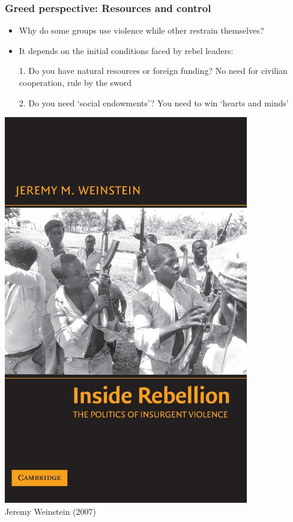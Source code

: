 \documentclass[aspectratio=43]{beamer}
\begin{document}
\begin{frame}
\frametitle{Greed perspective: Resources and control}
\centering

\begin{minipage}{0.6\textwidth}\centering
  \begin{itemize}[<+->]
    \item Why do some groups use violence while other restrain themselves?
    \item It depends on the initial conditions faced by rebel leaders:
    \item[1.] Do you have natural resources or foreign funding? No need for civilian cooperation, rule by the sword
    \item[2.] Do you need `social endowments'? You need to win `hearts and minds'
  \end{itemize}
\end{minipage}\hfill
\begin{minipage}{0.39\textwidth}\centering
\includegraphics[width = 0.8\textwidth]{img/weinstein2007}\\
{\small Jeremy Weinstein (2007)}
\end{minipage}

\end{frame}
\end{document}
